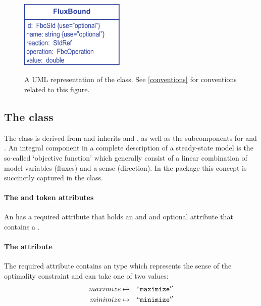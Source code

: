 \begin{figure}[h]
  \centering
  \includegraphics[width=5cm]{images/fbc_uml_fbnd.pdf}\\
  \caption{A UML representation of the \FBCPackage \FluxBound class. See
  \ref{conventions} for conventions related to this figure.}
  \label{fig:fbc_uml_fbnd}
\end{figure}


\subsection{The \FBC {} class}
\label{objective-class}
\label{listoffluxobjectives-class}

The \FBC \Objective class is derived from \SBML \SBase and inherits
 and , as well as the subcomponents for
\Annotation and \Notes. An integral component in a complete description of a
steady-state model is the so-called `objective function' which generally
consist of a linear combination of model variables (fluxes) and a sense
(direction). In the \FBC package this concept is succinctly captured in the
\Objective class.

\paragraph{The  and token  attributes}
An \Objective has a required attribute  that holds an
 and and optional attribute  that contains a
.

\paragraph{The  attribute}
The required  attribute contains an  type
which represents the sense of the optimality constraint and can take one of
two values:
\begin{eqnarray*}
\label{obj-type-enum}
 \nonumber
  maximize & \mapsto & ``\textcolor{black}{\textup{\ttfamily{maximize}}}''\\
  minimize & \mapsto & ``\textcolor{black}{\textup{\ttfamily{minimize}}}''
\end{eqnarray*}

